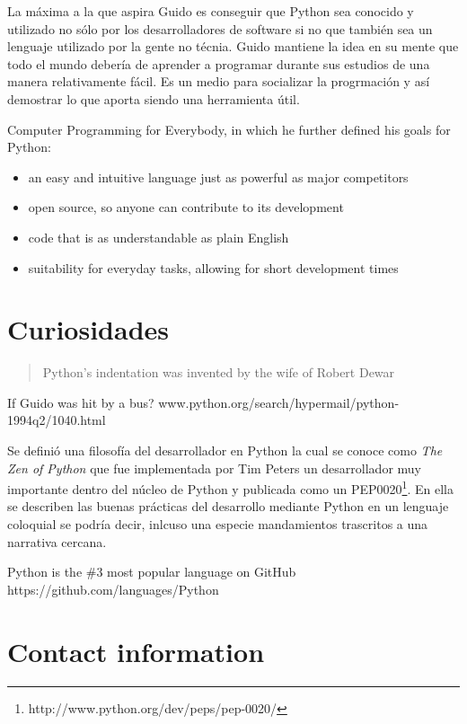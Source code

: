 \documentclass[11pt]{scrartcl}
\begin{document}
La máxima a la que aspira Guido es conseguir que Python sea conocido y utilizado no sólo por los desarrolladores de software si no que también sea un lenguaje utilizado por la gente no técnia. Guido mantiene la idea en su mente que todo el mundo debería de aprender a programar durante sus estudios de una manera relativamente fácil. Es un medio para socializar la progrmación y así demostrar lo que aporta siendo una herramienta útil.

Computer Programming for Everybody, in which he further defined his goals for Python:
\begin{itemize}
    \item an easy and intuitive language just as powerful as major competitors
    \item open source, so anyone can contribute to its development
    \item code that is as understandable as plain English
    \item suitability for everyday tasks, allowing for short development times
\end{itemize}

\section{Curiosidades}

\begin{quote}Python's indentation was invented by the wife of Robert Dewar\end{quote}

If Guido was hit by a bus? www.python.org/search/hypermail/python-1994q2/1040.html

Se definió una filosofía del desarrollador en Python la cual se conoce como \emph{The Zen of Python} que fue implementada por Tim Peters un desarrollador muy importante dentro del núcleo de Python y publicada como un PEP0020\footnote{http://www.python.org/dev/peps/pep-0020/}. En ella se describen las buenas prácticas del desarrollo mediante Python en un lenguaje coloquial se podría decir, inlcuso una especie mandamientos trascritos a una narrativa cercana.

Python is the \#3 most popular language on GitHub https://github.com/languages/Python

\section{Contact information}
\end{document}
